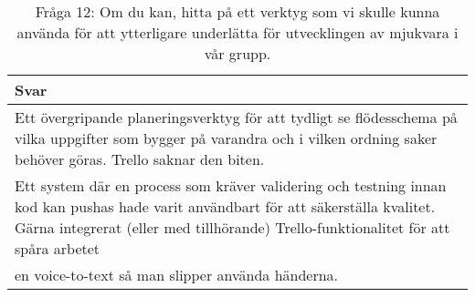 \begin{table}[h!]
\centering
  \caption{Fråga 12: Om du kan, hitta på ett verktyg som vi skulle kunna använda för att ytterligare underlätta för utvecklingen av mjukvara i vår grupp.}
  \def\arraystretch{1.5}
  \begin{adjustbox}{max width=\textwidth}
    \begin{tabularx}{\textwidth}{| X |}
      \hline
      \textbf{Svar} \\
      \hline
      Ett övergripande planeringsverktyg för att tydligt se flödesschema på vilka uppgifter som bygger på varandra och i vilken ordning saker behöver göras. Trello saknar den biten. \\
      \hline
      Ett system där en process som kräver validering och testning innan kod kan pushas hade varit användbart för att säkerställa kvalitet. Gärna integrerat (eller med tillhörande) Trello-funktionalitet för att spåra arbetet \\
      \hline
      en voice-to-text så man slipper använda händerna.\\
      \hline 
    \end{tabularx}
  \end{adjustbox}
\end{table}